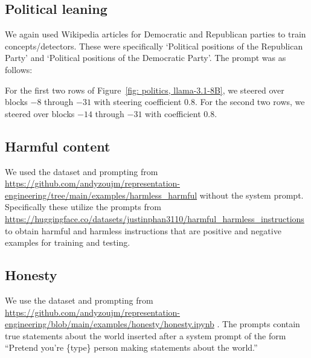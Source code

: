 \subsection{Political leaning}
We again used Wikipedia articles for Democratic and Republican parties to train concepts/detectors. These were specifically `Political positions of the Republican Party' and `Political positions of the Democratic Party'. The prompt was as follows:
\begin{center}
\end{center}
For the first two rows of Figure~\ref{fig: politics, llama-3.1-8B}, we steered over blocks $-8$ through $-31$ with steering coefficient 0.8. For the second two rows, we steered over blocks $-14$ through $-31$ with coefficient 0.8.  

\subsection{Harmful content}

We used the dataset and prompting from \url{https://github.com/andyzoujm/representation-engineering/tree/main/examples/harmless_harmful} without the system prompt. Specifically these utilize the prompts from \url{https://huggingface.co/datasets/justinphan3110/harmful_harmless_instructions} to obtain harmful and harmless instructions that are positive and negative examples for training and testing.

\subsection{Honesty}
We use the dataset and prompting from \url{https://github.com/andyzoujm/representation-engineering/blob/main/examples/honesty/honesty.ipynb} \citep{representation_engineering}. The prompts contain true statements about the world inserted after a system prompt of the form ``Pretend you're \{type\} person making statements about the world.'' 
\begin{center}
\end{center}